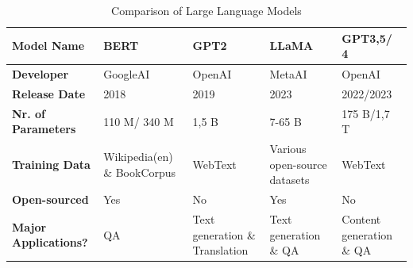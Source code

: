 \documentclass[runningheads]{llncs}
\begin{document}
\begin{table}[h!]
  \centering
  \begin{tabular}{| p{4cm} | p{2cm} | p{2cm} | p{2cm} | p{2cm} |}
  \hline
  \textbf{Model Name} & BERT & GPT2 & LLaMA & GPT3,5/ 4 \\
  \hline
  \textbf{Developer} & GoogleAI & OpenAI & MetaAI & OpenAI \\
  \hline
  \textbf{Release Date} & 2018 & 2019 & 2023 & 2022/2023 \\
  \hline
  \textbf{Nr. of Parameters} & 110 M/ 340 M & 1,5 B & 7-65 B & 175 B/1,7 T \\
  \hline
  \textbf{Training Data} & Wikipedia(en) \& BookCorpus & WebText & Various open-source datasets & WebText \\
  \hline
  \textbf{Open-sourced} & Yes & No & Yes & No \\
  \hline
  \textbf{Major Applications?} & QA & Text generation \& Translation & Text generation \& QA & Content generation \& QA \\
  \hline
  \end{tabular}
  \caption{Comparison of Large Language Models}
  \label{table:comparison}
  \end{table}
\end{document}
